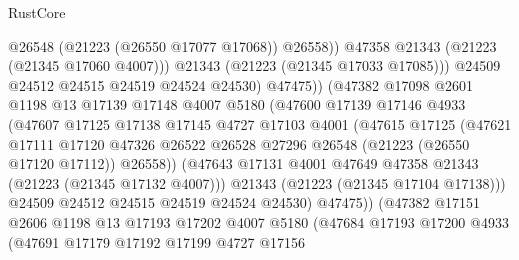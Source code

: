 \begin{lexlean}{RustCore}
\begin{coremodule}
                                  @26548
                                  (@21223 (@26550 @17077 @17068))
                                  @26558))
                              @47358
                              @21343
                              (@21223 (@21345 @17060 @4007)))
                            @21343
                            (@21223 (@21345 @17033 @17085)))
                          @24509
                          @24512
                          @24515
                          @24519
                          @24524
                          @24530)
                        @47475))
                    (@47382
                      @17098
                      @2601
                      @1198
                      @13
                      @17139
                      @17148
                      @4007
                      @5180
                      (@47600
                        @17139
                        @17146
                        @4933
                        (@47607
                          @17125
                          @17138
                          @17145
                          @4727
                          @17103
                          @4001
                          (@47615
                            @17125
                            (@47621
                              @17111
                              @17120
                              @47326
                              @26522
                              @26528
                              @27296
                              @26548
                              (@21223 (@26550 @17120 @17112))
                              @26558))
                          (@47643 @17131 @4001 @47649 @47358 @21343 (@21223 (@21345 @17132 @4007)))
                          @21343
                          (@21223 (@21345 @17104 @17138)))
                        @24509
                        @24512
                        @24515
                        @24519
                        @24524
                        @24530)
                      @47475))
                  (@47382
                    @17151
                    @2606
                    @1198
                    @13
                    @17193
                    @17202
                    @4007
                    @5180
                    (@47684
                      @17193
                      @17200
                      @4933
                      (@47691
                        @17179
                        @17192
                        @17199
                        @4727
                        @17156

\end{coremodule}
\end{lexlean}
